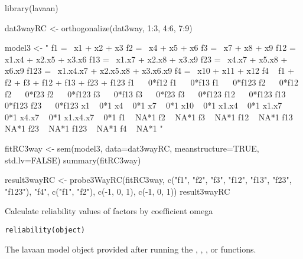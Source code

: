 \documentclass[a4paper]{book}
\begin{document}
%
\begin{Examples}
\begin{ExampleCode}
library(lavaan)

dat3wayRC <- orthogonalize(dat3way, 1:3, 4:6, 7:9)

model3 <- "
f1 =~ x1 + x2 + x3
f2 =~ x4 + x5 + x6
f3 =~ x7 + x8 + x9
f12 =~ x1.x4 + x2.x5 + x3.x6
f13 =~ x1.x7 + x2.x8 + x3.x9
f23 =~ x4.x7 + x5.x8 + x6.x9
f123 =~ x1.x4.x7 + x2.x5.x8 + x3.x6.x9
f4 =~ x10 + x11 + x12
f4 ~ f1 + f2 + f3 + f12 + f13 + f23 + f123
f1 ~~ 0*f12
f1 ~~ 0*f13
f1 ~~ 0*f123
f2 ~~ 0*f12
f2 ~~ 0*f23
f2 ~~ 0*f123
f3 ~~ 0*f13
f3 ~~ 0*f23
f3 ~~ 0*f123
f12 ~~ 0*f123
f13 ~~ 0*f123
f23 ~~ 0*f123
x1 ~ 0*1
x4 ~ 0*1
x7 ~ 0*1
x10 ~ 0*1
x1.x4 ~ 0*1
x1.x7 ~ 0*1
x4.x7 ~ 0*1
x1.x4.x7 ~ 0*1
f1 ~ NA*1
f2 ~ NA*1
f3 ~ NA*1
f12 ~ NA*1
f13 ~ NA*1
f23 ~ NA*1
f123 ~ NA*1
f4 ~ NA*1
" 

fitRC3way <- sem(model3, data=dat3wayRC, meanstructure=TRUE, std.lv=FALSE)
summary(fitRC3way)

result3wayRC <- probe3WayRC(fitRC3way, c("f1", "f2", "f3", "f12", "f13", "f23", "f123"), 
	"f4", c("f1", "f2"), c(-1, 0, 1), c(-1, 0, 1))
result3wayRC
\end{ExampleCode}
\end{Examples}
%
\begin{Description}\relax
Calculate reliability values of factors by coefficient omega
\end{Description}
%
\begin{Usage}
\begin{verbatim}
reliability(object)
\end{verbatim}
\end{Usage}
%
\begin{Arguments}
\begin{ldescription}
\item[\code{object}] The lavaan model object provided after running the , , , or  functions.
\end{ldescription}
\end{Arguments}
%
\end{document}
